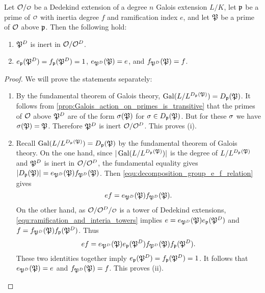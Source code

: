     \begin{proposition}\label{prop:decomposition_field_e_and_f}
      Let $\mc{O}/\smc{O}$ be a Dedekind extension of a degree $n$ Galois extension $L/K$, let $\mathfrak{p}$ be a prime of $\smc{O}$ with inertia degree $f$ and ramification index $e$, and let $\mathfrak{P}$ be a prime of $\mathcal{O}$ above $\mathfrak{p}$. Then the following hold:
      \begin{enumerate}[label=(\roman*)]
        \item $\mathfrak{P}^{D}$ is inert in $\mathcal{O}/\mathcal{O}^{D}$.
        \item $e_{\mathfrak{p}}(\mathfrak{P}^{D}) = f_{\mathfrak{p}}(\mathfrak{P}^{D}) = 1$, $e_{\mathfrak{P}^{D}}(\mathfrak{P}) = e$, and $f_{\mathfrak{P}^{D}}(\mathfrak{P}) = f$.
      \end{enumerate}
    \end{proposition}
    \begin{proof}
      We will prove the statements separately:
      \begin{enumerate}[label=(\roman*)]
        \item By the fundamental theorem of Galois theory, $\operatorname{\mathrm{Gal}}(L/L^{D_{\mathfrak{p}}(\mathfrak{P})}) = D_{\mathfrak{p}}(\mathfrak{P})$. It follows from \cref{prop:Galois_action_on_primes_is_transitive} that the primes of $\mathcal{O}$ above $\mathfrak{P}^{D}$ are of the form $\sigma(\mathfrak{P})$ for $\sigma \in D_{\mathfrak{p}}(\mathfrak{P})$. But for these $\sigma$ we have $\sigma(\mathfrak{P}) = \mathfrak{P}$. Therefore $\mathfrak{P}^{D}$ is inert $\mathcal{O}/\mathcal{O}^{D}$. This proves (i).
        \item Recall $\operatorname{\mathrm{Gal}}(L/L^{D_{\mathfrak{p}}(\mathfrak{P})}) = D_{\mathfrak{p}}(\mathfrak{P})$ by the fundamental theorem of Galois theory. On the one hand, since $|\operatorname{\mathrm{Gal}}(L/L^{D_{\mathfrak{p}}(\mathfrak{P})})|$ is the degree of $L/L^{D_{\mathfrak{p}}(\mathfrak{P})}$ and $\mathfrak{P}^{D}$ is inert in $\mathcal{O}/\mathcal{O}^{D}$, the fundamental equality gives $|D_{\mathfrak{p}}(\mathfrak{P})| = e_{\mathfrak{P}^{D}}(\mathfrak{P})f_{\mathfrak{P}^{D}}(\mathfrak{P})$. Then \cref{equ:decomposition_group_e_f_relation} gives
        \[
          ef = e_{\mathfrak{P}^{D}}(\mathfrak{P})f_{\mathfrak{P}^{D}}(\mathfrak{P}).
        \]
        On the other hand, as $\mc{O}/\mc{O}^{D}/\smc{O}$ is a tower of Dedekind extensions, \cref{equ:ramification_and_interia_towers} implies $e = e_{\mathfrak{P}^{D}}(\mathfrak{P})e_{\mathfrak{p}}(\mathfrak{P}^{D})$ and $f = f_{\mathfrak{P}^{D}}(\mathfrak{P})f_{\mathfrak{p}}(\mathfrak{P}^{D})$. Thus
        \[
          ef = e_{\mathfrak{P}^{D}}(\mathfrak{P})e_{\mathfrak{p}}(\mathfrak{P}^{D})f_{\mathfrak{P}^{D}}(\mathfrak{P})f_{\mathfrak{p}}(\mathfrak{P}^{D}).
        \]
        These two identities together imply $e_{\mathfrak{p}}(\mathfrak{P}^{D}) = f_{\mathfrak{p}}(\mathfrak{P}^{D}) = 1$. It follows that $e_{\mathfrak{P}^{D}}(\mathfrak{P}) = e$ and $f_{\mathfrak{P}^{D}}(\mathfrak{P}) = f$. This proves (ii).
      \end{enumerate}
    \end{proof}
    
